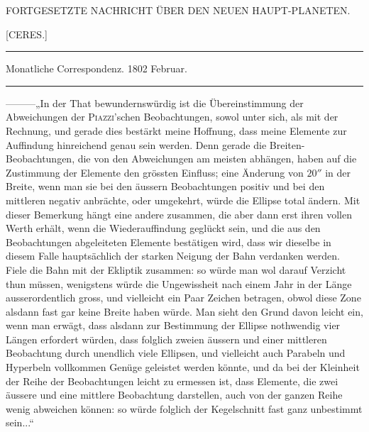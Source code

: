 \bigskip{}
\begin{center}
{\small FORTGESETZTE NACHRICHT ÜBER DEN NEUEN HAUPT-PLANETEN.\par}
[CERES.]\par
\medskip\hrule\medskip
Monatliche Correspondenz. 1802 Februar.\par
\medskip\hrule
\end{center}\medskip
—\quad —\quad —\quad „In der That bewundernswürdig ist die Übereinstimmung der Abweichungen der \textsc{Piazzi}'schen Beobachtungen, sowol unter sich, als mit der Rechnung, und gerade dies bestärkt meine Hoffnung, dass meine Elemente zur Auffindung hinreichend genau sein werden. Denn gerade die Breiten-Beobachtungen, die von den Abweichungen am meisten abhängen, haben auf die Zustimmung der Elemente den grössten Einfluss; eine Änderung von $20''$ in der Breite, wenn man sie bei den äussern Beobachtungen positiv und bei den mittleren negativ anbrächte, oder umgekehrt, würde die Ellipse total ändern. Mit dieser Bemerkung hängt eine andere zusammen, die aber dann erst ihren vollen Werth erhält, wenn die Wiederauffindung geglückt sein, und die aus den Beobachtungen abgeleiteten Elemente bestätigen wird, dass wir dieselbe in diesem Falle hauptsächlich der starken Neigung der Bahn verdanken werden. Fiele die Bahn mit der Ekliptik zusammen: so würde man wol darauf Verzicht thun müssen, wenigstens würde die Ungewissheit nach einem Jahr in der Länge ausserordentlich gross, und vielleicht ein Paar Zeichen betragen, obwol diese Zone alsdann fast gar keine Breite haben würde. Man sieht den Grund davon leicht ein, wenn man erwägt, dass alsdann zur Bestimmung der Ellipse nothwendig vier Längen erfordert würden, dass folglich zweien äussern und einer mittleren Beobachtung durch unendlich viele Ellipsen, und vielleicht auch Parabeln und Hyperbeln vollkommen Genüge geleistet werden könnte, und da bei der Kleinheit der Reihe der Beobachtungen leicht zu ermessen
%
ist, dass Elemente, die zwei äussere und eine mittlere Beobachtung darstellen, auch von der ganzen Reihe wenig abweichen können: so würde folglich der Kegelschnitt fast ganz unbestimmt sein...“

